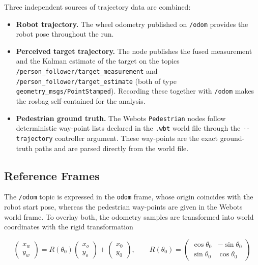 \documentclass[12pt,a4paper]{article}
\begin{document}
Three independent sources of trajectory data are combined:

\begin{itemize}
  \item \textbf{Robot trajectory.} The wheel odometry published on
    \texttt{/odom} provides the robot pose throughout the run.
  \item \textbf{Perceived target trajectory.} The node publishes the fused
    measurement and the Kalman estimate of the target on the topics
    \texttt{/person\_\allowbreak follower/\allowbreak target\_\allowbreak measurement} and
    \texttt{/person\_\allowbreak follower/\allowbreak target\_\allowbreak estimate} (both of type
    \texttt{geometry\_\allowbreak msgs/\allowbreak PointStamped}). Recording these together with
    \texttt{/odom} makes the rosbag self-contained for the analysis.
  \item \textbf{Pedestrian ground truth.} The Webots \texttt{Pedestrian}
    nodes follow deterministic way-point lists declared in the \texttt{.wbt}
    world file through the \texttt{-{}-trajectory} controller argument. These
    way-points are the exact ground-truth paths and are parsed directly from
    the world file.
\end{itemize}

\subsection{Reference Frames}

The \texttt{/odom} topic is expressed in the \texttt{odom} frame, whose origin
coincides with the robot start pose, whereas the pedestrian way-points are
given in the Webots world frame. To overlay both, the odometry samples are
transformed into world coordinates with the rigid transformation

\begin{equation}
  \begin{pmatrix} x_w \\ y_w \end{pmatrix} =
  R(\theta_0)
  \begin{pmatrix} x_o \\ y_o \end{pmatrix} +
  \begin{pmatrix} x_0 \\ y_0 \end{pmatrix},
  \qquad
  R(\theta_0) =
  \begin{pmatrix} \cos\theta_0 & -\sin\theta_0 \\
                  \sin\theta_0 &  \cos\theta_0 \end{pmatrix}
\end{equation}
\end{document}
